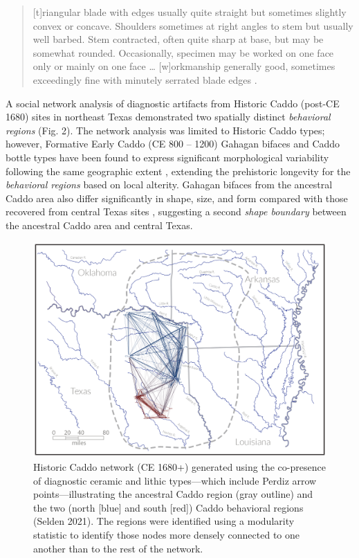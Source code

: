 \documentclass[smallextended]{svjour3}       %
\begin{document}
\begin{quote}
{[}t{]}riangular blade with edges usually quite straight but sometimes
slightly convex or concave. Shoulders sometimes at right angles to stem
but usually well barbed. Stem contracted, often quite sharp at base, but
may be somewhat rounded. Occasionally, specimen may be worked on one
face only or mainly on one face \ldots{} {[}w{]}orkmanship generally
good, sometimes exceedingly fine with minutely serrated blade edges
\cite[504]{RN5769}.
\end{quote}

A social network analysis of diagnostic artifacts from Historic Caddo
(post-CE 1680) sites in northeast Texas demonstrated two spatially
distinct \emph{behavioral regions} \cite{RN8031} (Fig. 2). The network
analysis was limited to Historic Caddo types; however, Formative Early
Caddo (CE 800 -- 1200) Gahagan bifaces and Caddo bottle types have been
found to express significant morphological variability following the
same geographic extent \cite{RN8074,RN7927,RN8370,RN8312}, extending the
prehistoric longevity for the \emph{behavioral regions} based on local
alterity. Gahagan bifaces from the ancestral Caddo area also differ
significantly in shape, size, and form compared with those recovered
from central Texas sites \cite{RN8322}, suggesting a second \emph{shape
boundary} between the ancestral Caddo area and central Texas.

\begin{figure}
\includegraphics[width=1\linewidth]{ms-figs/figure1} \caption{Historic Caddo network (CE 1680+) generated using the co-presence of diagnostic ceramic and lithic types---which include Perdiz arrow points---illustrating the ancestral Caddo region (gray outline) and the two (north [blue] and south [red]) Caddo behavioral regions (Selden 2021). The regions were identified using a modularity statistic to identify those nodes more densely connected to one another than to the rest of the network.}\label{fig:fig1}
\end{figure}
\end{document}
